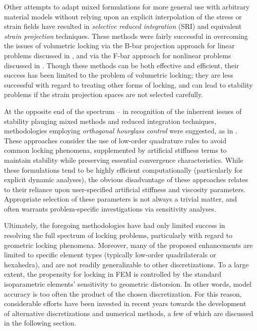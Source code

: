 		Other attempts to adapt mixed formulations for more general use with arbitrary material models without relying upon an explicit interpolation of the stress or strain fields have resulted in \textit{selective reduced integration} (SRI) and equivalent \textit{strain projection} techniques. These methods were fairly successful in overcoming the issues of volumetric locking via the B-bar projection approach for linear problems discussed in \cite{Hughes:00}, and via the F-bar approach for nonlinear problems discussed in \cite{Souza:96}. Though these methods can be both effective and efficient, their success has been limited to the problem of volumetric locking; they are less successful with regard to treating other forms of locking, and can lead to stability problems if the strain projection spaces are not selected carefully.
		
		At the opposite end of the spectrum -- in recognition of the inherrent issues of stability plauging mixed methods and reduced integration techniques, methodologies employing \textit{orthogonal hourglass control} were suggested, as in \cite{Flanagan:81}. These approaches consider the use of low-order quadrature rules to avoid common locking phenomena, supplemented by artificial stiffness terms to maintain stability while preserving essential convergence characteristics. While these formulations tend to be highly efficient computationally (particularly for explicit dynamic analyses), the obvious disadvantage of these approaches relates to their reliance upon user-specified artificial stiffness and viscosity parameters. Appropriate selection of these parameters is not always a trivial matter, and often warrants problem-specific investigations via sensitivity analyses.
			
		Ultimately, the foregoing methodologies have had only limited success in resolving the full spectrum of locking problems, particularly with regard to geometric locking phenomena. Moreover, many of the proposed enhancements are limited to specific element types (typically low-order quadrilaterals or hexahedra), and are not readily generalizable to other discretizations. To a large extent, the propensity for locking in FEM is controlled by the standard isoparametric elements' sensitivity to geometric distorsion. In other words, model accuracy is too often the product of the chosen discretization. For this reason, considerable efforts have been invested in recent years towards the development of alternative discretizations and numerical methods, a few of which are discussed in the following section.
	

